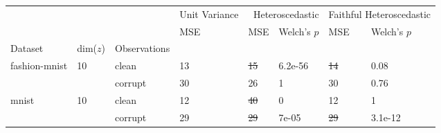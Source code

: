 \begin{tabular}{lll|l|ll|ll}
\toprule
 &  &  & Unit Variance & \multicolumn{2}{r}{Heteroscedastic} & \multicolumn{2}{r}{Faithful Heteroscedastic} \\
 &  &  & MSE & MSE & Welch's $p$ & MSE & Welch's $p$ \\
Dataset & dim($z$) & Observations &  &  &  &  &  \\
\midrule
\multirow[c]{2}{*}{fashion-mnist} & \multirow[c]{2}{*}{10} & clean & 13 & \sout{15} & 6.2e-56 & \sout{14} & 0.08 \\
 &  & corrupt & 30 & 26 & 1 & 30 & 0.76 \\
\multirow[c]{2}{*}{mnist} & \multirow[c]{2}{*}{10} & clean & 12 & \sout{40} & 0 & 12 & 1 \\
 &  & corrupt & 29 & \sout{29} & 7e-05 & \sout{29} & 3.1e-12 \\
\bottomrule
\end{tabular}

